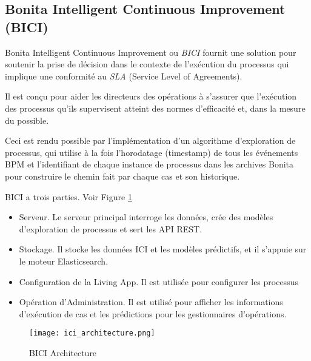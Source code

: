\subsection{Bonita Intelligent Continuous Improvement (BICI)}


Bonita Intelligent Continuous Improvement ou \emph{BICI} fournit une solution pour soutenir la prise de décision dans le contexte de l'exécution du processus qui implique une conformité au \textit{SLA} (Service Level of Agreements).

Il est conçu pour aider les directeurs des opérations à s'assurer que l'exécution des processus qu'ils supervisent atteint des normes d'efficacité et, dans la mesure du possible.

Ceci est rendu possible par l'implémentation d'un algorithme d'exploration de processus, qui utilise à la fois l'horodatage (timestamp) de tous les événements BPM et l'identifiant de chaque instance de processus dans les archives Bonita pour construire le chemin fait par chaque cas et son historique.

BICI a trois parties. Voir Figure \ref{fig:ici_architecture}
\begin{itemize}
  \item Serveur. Le serveur principal interroge les données, crée des modèles d'exploration de processus et sert les API REST.
  \item Stockage. Il stocke les données ICI et les modèles prédictifs, et il s'appuie sur le moteur Elasticsearch.
  \item Configuration de la Living App. Il est utilisée pour configurer les processus
  \item Opération d'Administration. Il est utilisé pour afficher les informations d'exécution de cas et les prédictions pour les gestionnaires d'opérations.
\end{itemize}

\begin{figure}[!ht]
\centering
\texttt{[image: ici\_architecture.png]}
\caption{BICI Architecture}
\label{fig:ici_architecture}
\end{figure}
